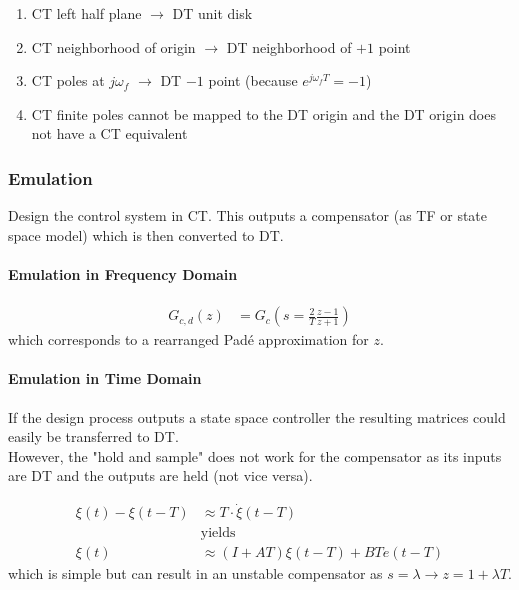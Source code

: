 \begin{enumerate}
    \item CT left half plane $\rightarrow$ DT unit disk
    \item CT neighborhood of origin $\rightarrow$ DT neighborhood of $+1$ point
    \item CT poles at $j\omega_f$ $\rightarrow$ DT $-1$ point (because $e^{j\omega_fT}=-1$)
    \item CT finite poles cannot be mapped to the DT origin and the DT origin does not have a CT equivalent
\end{enumerate}
\subsubsection{Emulation}
Design the control system in CT. This outputs a compensator (as TF or state space model) which is then converted to DT.
\paragraph{Emulation in Frequency Domain}

\noindent\begin{align*}
    G_{c,d}(z) & =G_{c}\left(s=\frac2T\frac{z-1}{z+1}\right)
\end{align*}
which corresponds to a rearranged Padé approximation for $z$.
\paragraph{Emulation in Time Domain}
If the design process outputs a state space controller the resulting matrices could easily be transferred to DT.\\
However, the "hold and sample" does not work for the compensator as its inputs are DT and the outputs are held (not vice versa).\\

\noindent\begin{align*}
    \xi(t)-\xi(t-T) & \approx T\cdot\dot{\xi}(t-T)   \\
                    & \text{yields}                  \\
    \xi(t)          & \approx(I+AT)\xi(t-T)+BTe(t-T)
\end{align*}
which is simple but can result in an unstable compensator as $s=\lambda \rightarrow z=1+\lambda T$.\\
%

